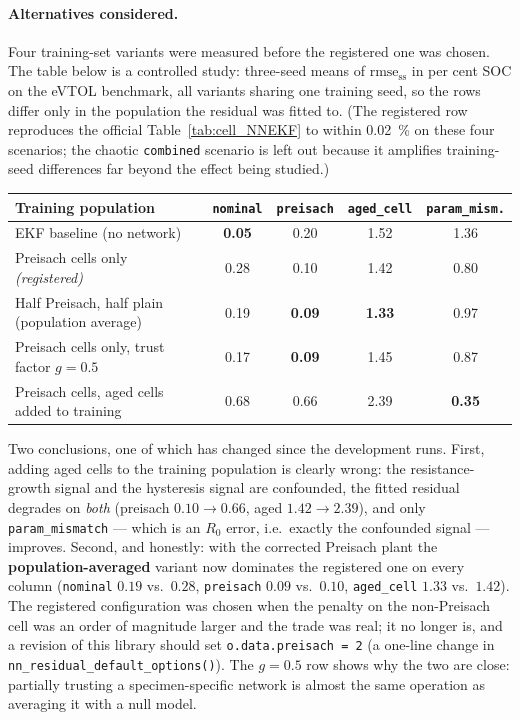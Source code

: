 \paragraph{Alternatives considered.}  Four training-set variants were measured before the
registered one was chosen.  The table below is a controlled study: three-seed means of
$\mathrm{rmse_{ss}}$ in per cent SOC on the eVTOL benchmark, all variants sharing one training
seed, so the rows differ only in the population the residual was fitted to.  (The registered row
reproduces the official Table~\ref{tab:cell_NNEKF} to within \SI{0.02}{\percent} on these four
scenarios; the chaotic \texttt{combined} scenario is left out because it amplifies
training-seed differences far beyond the effect being studied.)
\begin{center}
\begin{tabular}{@{}lcccc@{}}
\toprule
Training population & \texttt{nominal} & \texttt{preisach} & \texttt{aged\_cell} & \texttt{param\_mism.} \\
\midrule
EKF baseline (no network)                        & \textbf{0.05} & 0.20 & 1.52 & 1.36 \\
Preisach cells only \emph{(registered)}          & 0.28 & 0.10 & 1.42 & 0.80 \\
Half Preisach, half plain (population average)   & 0.19 & \textbf{0.09} & \textbf{1.33} & 0.97 \\
Preisach cells only, trust factor $g = 0.5$      & 0.17 & \textbf{0.09} & 1.45 & 0.87 \\
Preisach cells, aged cells added to training     & 0.68 & 0.66 & 2.39 & \textbf{0.35} \\
\bottomrule
\end{tabular}
\end{center}
Two conclusions, one of which has changed since the development runs.  First, adding aged cells to
the training population is clearly wrong: the resistance-growth signal and the hysteresis signal
are confounded, the fitted residual degrades on \emph{both} (preisach $0.10\to0.66$, aged
$1.42\to2.39$), and only \texttt{param\_mismatch} --- which is an $R_0$ error, i.e.\ exactly the
confounded signal --- improves.  Second, and honestly: with the corrected Preisach plant the
\textbf{population-averaged} variant now dominates the registered one on every column
(\texttt{nominal} $0.19$ vs.\ $0.28$, \texttt{preisach} $0.09$ vs.\ $0.10$, \texttt{aged\_cell}
$1.33$ vs.\ $1.42$).  The registered configuration was chosen when the penalty on the non-Preisach
cell was an order of magnitude larger and the trade was real; it no longer is, and a revision of
this library should set \texttt{o.data.preisach = 2} (a one-line change in
\texttt{nn\_residual\_default\_options()}).  The $g = 0.5$ row shows why the two are close:
partially trusting a specimen-specific network is almost the same operation as averaging it with a
null model.

